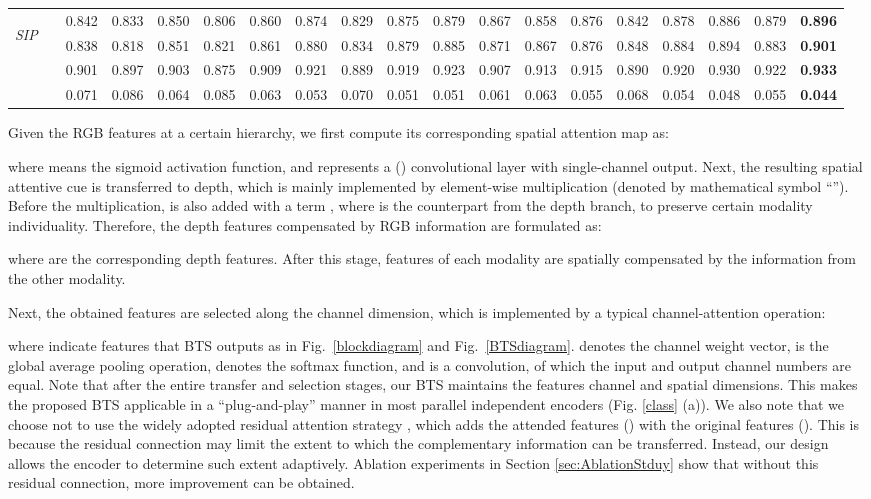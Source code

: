 \documentclass{article}
\begin{document}
\begin{table*}[ht]
\begin{tabular}{lr|cccccccccccccccc||c}
\multirow{4}{*}{\begin{sideways}\textit{SIP}\end{sideways}}
&   & 0.842 & 0.833 &0.850 & 0.806 & 0.860 &0.874 &0.829	&0.875	&0.879	&0.867	&0.858	&0.876	&0.842	&0.878	&0.886	&0.879 &\bf{0.896} \\
		&   & 0.838 & 0.818 &0.851 & 0.821 & 0.861 &0.880  &0.834	&0.879	&0.885	&0.871	&0.867	&0.876	&0.848	&0.884	&0.894	&0.883 &\bf{0.901} \\
		&   & 0.901 & 0.897 &0.903 & 0.875 & 0.909 &0.921 &0.889	&0.919	&0.923	&0.907	&0.913	&0.915	& 0.890	&0.920	&0.930	&0.922 &\bf{0.933}\\
		&    & 0.071 & 0.086 &0.064 & 0.085 & 0.063 &0.053 &0.070	&0.051	&0.051	&0.061	&0.063	&0.055	&0.068	&0.054	&0.048	&0.055 &\bf{0.044}\\
		\bottomrule
		\hline
	\end{tabular}
	\vspace{-8pt}
\end{table*}

Given the RGB features  at a certain hierarchy, we first compute its corresponding spatial attention map  as:
 
where  means the sigmoid activation function, and  represents a () convolutional layer with single-channel output.
Next, the resulting spatial attentive cue  is transferred to depth, which is mainly implemented by element-wise multiplication (denoted by mathematical symbol ``''). Before the multiplication,  is also added with a term , where  is the counterpart from the depth branch, to preserve certain modality individuality. Therefore, the depth features compensated by RGB information are formulated as: 

where  are the corresponding depth features. After this stage, features of each modality are spatially compensated by the information from the other modality. 

Next, the obtained features  are selected along the channel dimension, which is implemented by a typical channel-attention operation\cite{CBAM}:

where  indicate features that BTS outputs as in Fig.~\ref{blockdiagram} and Fig.~\ref{BTSdiagram}.  denotes the channel weight vector,  is the global average pooling operation,  denotes the softmax function, and  is a  convolution, of which the input and output channel numbers are equal.
Note that after the entire transfer and selection stages, our BTS maintains the features channel and spatial dimensions. This makes the proposed BTS applicable in a ``plug-and-play'' manner in most parallel independent encoders (Fig. \ref{class} (a)). We also note that we choose not to use the widely adopted residual attention strategy \cite{ResidualAN}, which adds the attended features  () with the original features  (). This is because the residual connection may limit the extent to which the complementary information can be transferred. Instead, our design allows the encoder to determine such extent adaptively. Ablation experiments in Section \ref{sec:AblationStduy} show that without this residual connection, more improvement can be obtained.   
\end{document}
